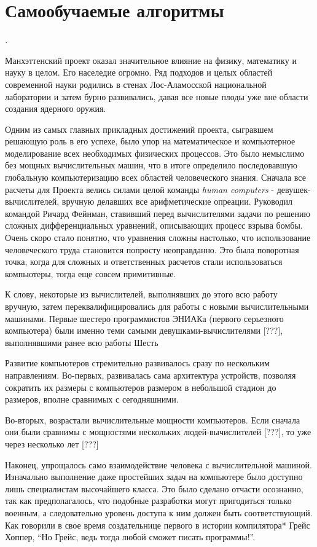 \chapter{Самообучаемые алгоритмы}\label{ch:self_learning_algorithms}

\epigraph{\emph{.}}{}

Манхэттенский проект оказал значительное влияние на физику, математику и науку в целом.
Его населедие огромно.
Ряд подходов и целых областей современной науки родились в стенах Лос-Аламосской национальной лаборатории и затем бурно развивались, давая все новые плоды уже вне области создания ядерного оружия.

Одним из самых главных прикладных достижений проекта, сыгравшем решающую роль в его успехе, было упор на математическое и компьютерное моделирование всех необходимых физических процессов.
Это было немыслимо без мощных вычислительных машин, что в итоге определило последовавшую глобальную компьютеризацию всех областей человеческого знания.
Сначала все расчеты для Проекта велись силами целой команды \textit{human computers} - девушек-вычислителей, вручную делавших все арифметические опреации.
Руководил командой Ричард Фейнман, ставивший перед вычислителями задачи по решению сложных дифференциальных уравнений, описывающих процесс взрыва бомбы.
Очень скоро стало понятно, что уравнения сложны настолько, что использование человеческого труда становится попросту неоправданно.   
Это была поворотная точка, когда для сложных и ответственных расчетов стали использоваться компьютеры, тогда еще совсем примитивные.

К слову, некоторые из вычислителей, выполнявших до этого всю работу вручную, затем переквалифицировались для работы с новыми вычислительными машинами.
Первые шестеро программистов ЭНИАКа (первого серьезного компьютера) были именно теми самыми девушками-вычислителями [???], выполнявшими ранее всю работы 
Шесть

Развитие компьютеров стремительно развивалось сразу по нескольким направлениям.
Во-первых, развивалась сама архитектура устройств, позволяя сократить их размеры с компьютеров размером в небольшой стадион до размеров, вполне сравнимых с сегодняшними.

Во-вторых, возрастали вычислительные мощности компьютеров.
Если сначала они были сравнимы с мощностями нескольких людей-вычислителей [???], то уже через несколько лет [???]

Наконец, упрощалось само взаимодействие человека с вычислительной машиной.
Изначально выполнение даже простейших задач на компьютере было доступно лишь специалистам высочайшего класса.
Это было сделано отчасти осознанно, так как предполагалось, что подобные разработки могут пригодиться только военным, а следовательно уровень доступа к ним должен быть соответствующий.
Как говорили в свое время создательнице первого в истории компилятора*  Грейс Хоппер, “Но Грейс, ведь тогда любой сможет писать программы!”.

